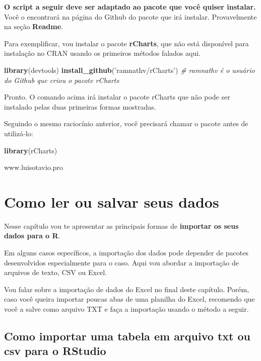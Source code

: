 \documentclass[
]{book}
\newenvironment{Shaded}{\begin{snugshade}}{\end{snugshade}}
\newcommand{\CommentTok}[1]{\textcolor[rgb]{0.56,0.35,0.01}{\textit{#1}}}
\newcommand{\KeywordTok}[1]{\textcolor[rgb]{0.13,0.29,0.53}{\textbf{#1}}}
\newcommand{\NormalTok}[1]{#1}
\newcommand{\StringTok}[1]{\textcolor[rgb]{0.31,0.60,0.02}{#1}}
\begin{document}
\textbf{O script a seguir deve ser adaptado ao pacote que você quiser
instalar.} Você o encontrará na página do Github do pacote que irá
instalar. Provavelmente na seção \textbf{Readme}.

Para exemplificar, vou instalar o pacote \textbf{rCharts}, que não está
disponível para instalação no CRAN usando os primeiros métodos falados
aqui.

\begin{Shaded}
\begin{Highlighting}[]
\KeywordTok{library}\NormalTok{(devtools)}
\KeywordTok{install_github}\NormalTok{(}\StringTok{'ramnathv/rCharts'}\NormalTok{) }\CommentTok{# ramnathv é o usuário do Github que criou o pacote rCharts}
\end{Highlighting}
\end{Shaded}

Pronto. O comando acima irá instalar o pacote rCharts que não pode ser
instalado pelas duas primeiras formas mostradas.

Seguindo o mesmo raciocínio anterior, você precisará chamar o pacote
antes de utilizá-lo:

\begin{Shaded}
\begin{Highlighting}[]
\KeywordTok{library}\NormalTok{(rCharts)}
\end{Highlighting}
\end{Shaded}

www.luisotavio.pro

\hypertarget{como-ler-ou-salvar-seus-dados}{%
\chapter{Como ler ou salvar seus
dados}\label{como-ler-ou-salvar-seus-dados}}

Nesse capítulo vou te apresentar as principais formas de
\textbf{importar os seus dados para o R}.

Em alguns casos específicos, a importação dos dados pode depender de
pacotes desenvolvidos especialmente para o caso. Aqui vou abordar a
importação de arquivos de texto, CSV ou Excel.

Vou falar sobre a importação de dados do Excel no final deste capítulo.
Porém, caso você queira importar poucas abas de uma planilha do Excel,
recomendo que você a salve como arquivo TXT e faça a importação usando o
método a seguir.

\hypertarget{como-importar-uma-tabela-em-arquivo-txt-ou-csv-para-o-rstudio}{%
\section{Como importar uma tabela em arquivo txt ou csv para o
RStudio}\label{como-importar-uma-tabela-em-arquivo-txt-ou-csv-para-o-rstudio}}
\end{document}
